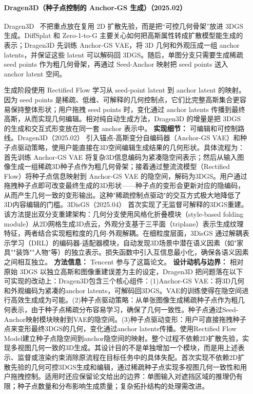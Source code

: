 \paragraph{Dragen3D（种子点控制的 Anchor-GS 生成）（2025.02）}
Dragen3D~\cite{2502_16475} 不把重点放在复用 2D 扩散先验，而是把“可控几何骨架”放进 3DGS 生成。DiffSplat 和 Zero-1-to-G 主要关心如何把高斯属性转成扩散模型能生成的表示；Dragen3D 先训练 Anchor-GS VAE，将 3D 几何和外观压成一组 anchor latents，并保证这些 latent 可以解码回 3DGS。随后，单图分支只需要生成稀疏 seed points 作为粗几何骨架，再通过 Seed-Anchor 映射把 seed points 送入 anchor latent 空间。

生成阶段使用 Rectified Flow 学习从 seed-point latent 到 anchor latent 的映射。因为 seed points 是稀疏、低维、可解释的几何控制点，它们比完整高斯集合更容易保持整体形状；用户拖拽 seed points 时，变化通过 anchor latents 传播到最终高斯，从而实现几何编辑。相对纯自动生成方法，Dragen3D 的增量是把 3DGS 的生成和交互式形变放在同一套 anchor 表示中。
\textbf{实现细节：} 可编辑和可控制路线。Dragen3D（2025.02） 引入锚点-高斯变分自编码器（Anchor-GS VAE）和种子点驱动策略，使用户能直接在3D空间编辑生成结果的几何形状。具体流程为：首先训练 Anchor-GS VAE 将复杂3D信息编码为紧凑隐空间表示；然后从输入图像生成一组稀疏3D种子点作为粗几何骨架；接着通过整流流模型（Rectified Flow）将种子点信息映射到 Anchor-GS VAE 的隐空间，解码为3DGS。用户通过拖拽种子点即可改变最终生成的3D形状——种子点的变形会更新对应的隐编码，从而产生几何一致的变形输出。这种"稀疏控制点驱动"的交互方式极大地降低了3D内容编辑的门槛。3DisGS（2025.04） 首次实现了无监督可解释的3DGS重建。该方法提出双分支重建架构：几何分支使用风格化折叠模块（style-based folding module）从2D网格生成3D点云，外观分支基于三平面（triplane）表示生成纹理特征，两者结合实现粗粒度的几何-外观解耦。在细粒度层面，3DisGS 通过解耦表示学习（DRL）的编码器-适配器模块，自动发现3D场景中潜在语义因素（如"家具""装饰""人物"等）的独立表示。损失函数中引入互信息最小化，确保各语义因素之间相互独立。
\textbf{方法信息：} Tencent 参与了这篇论文。
\textbf{设计动机与边界：} 相对原始 3DGS 以独立高斯和图像重建误差为主的设定，Dragen3D 把问题落在以下可实现的改动上：Dragen3D包含三个核心组件：(1)Anchor-GS VAE：将3D几何和外观编码为紧凑的anchor latents，可解码回3DGS。VAE的训练使得在隐空间进行高效生成成为可能。(2)种子点驱动策略：从单张图像生成稀疏种子点作为粗几何表示，由于种子点稀疏分布容易学习，确保了几何一致性。种子点通过Seed-Anchor映射模块映射到VAE的隐空间。(3)种子点驱动变形：用户可直接拖拽种子点来变形最终3DGS的几何，变化通过anchor latents传播。使用Rectified Flow Model建立种子点隐空间到anchor隐空间的映射。整个过程不依赖2D扩散先验，实现多视图几何一致的3D生成。其设计目的不是单独增加一个模块，而是用上述表示、监督或渲染约束消除原流程在目标任务中的具体失配。首次实现不依赖2D扩散先验的几何可控3DGS生成和编辑，通过稀疏种子点实现多视图几何一致性和用户拖拽控制。适用时还应保留论文给出的边界：单图输入对遮挡区域的推理仍有限；种子点数量和分布影响生成质量；复杂拓扑结构的处理需改进。
